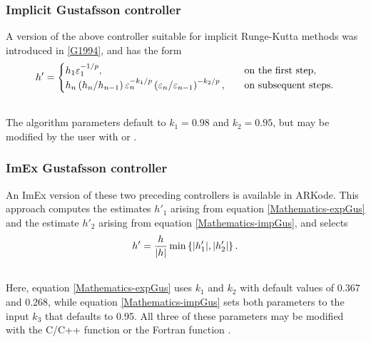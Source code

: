 \documentclass[letterpaper,10pt,english]{sphinxmanual}
\begin{document}
\subsubsection{Implicit Gustafsson controller}
\label{Mathematics:mathematics-adaptivity-errorcontrol-igus}\label{Mathematics:implicit-gustafsson-controller}
A version of the above controller suitable for implicit Runge-Kutta
methods was introduced in {\hyperref[References:g1994]{{[}G1994{]}}}, and has the form
\label{Mathematics:equation-impGus}\begin{gather}
\begin{split}h' = \begin{cases}
   h_1 \varepsilon_1^{-1/p}, &\quad\text{on the first step}, \\
   h_n \left(h_n / h_{n-1}\right) \varepsilon_n^{-k_1/p}
     \left(\varepsilon_n/\varepsilon_{n-1}\right)^{-k_2/p}, &
   \quad\text{on subsequent steps}.
\end{cases}\end{split}\label{Mathematics-impGus}\\\begin{split}\end{split}\notag
\end{gather}
The algorithm parameters default to $k_1 = 0.98$ and
$k_2 = 0.95$, but may be modified by the user with
{\hyperref[c_interface/User_callable:ARKodeSetAdaptivityMethod]{}} or {\hyperref[f_interface/Usage:f/_/FARKSETADAPTIVITYMETHOD]{}}.


\subsubsection{ImEx Gustafsson controller}
\label{Mathematics:imex-gustafsson-controller}\label{Mathematics:mathematics-adaptivity-errorcontrol-iegus}
An ImEx version of these two preceding controllers is available in
ARKode.  This approach computes the estimates $h'_1$ arising from
equation \eqref{Mathematics-expGus} and the estimate $h'_2$ arising from
equation \eqref{Mathematics-impGus}, and selects
\begin{gather}
\begin{split}h' = \frac{h}{|h|}\min\left\{|h'_1|, |h'_2|\right\}.\end{split}\notag\\\begin{split}\end{split}\notag
\end{gather}
Here, equation \eqref{Mathematics-expGus} uses $k_1$ and
$k_2$ with default values of 0.367 and 0.268, while equation
\eqref{Mathematics-impGus} sets both parameters to the input $k_3$ that
defaults to 0.95.  All three of these parameters may be modified with
the C/C++ function {\hyperref[c_interface/User_callable:ARKodeSetAdaptivityMethod]{}} or the
Fortran function {\hyperref[f_interface/Usage:f/_/FARKSETADAPTIVITYMETHOD]{}}.
\end{document}
